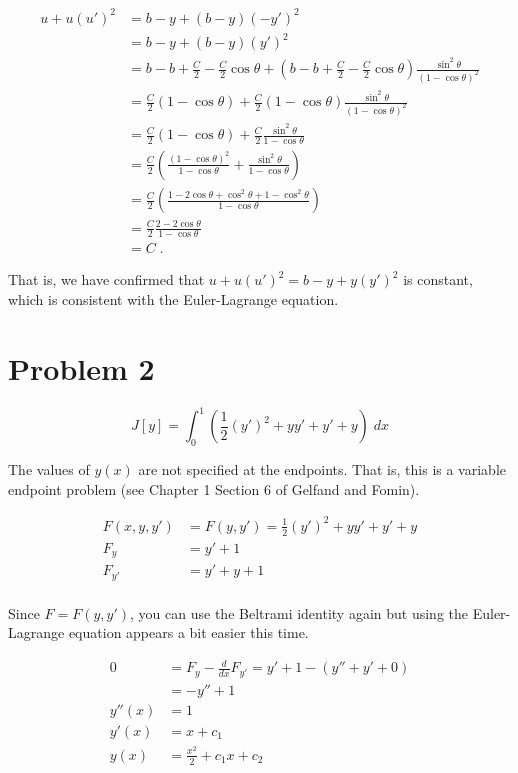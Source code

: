 \documentclass[a4paper]{article}
\begin{document}
\begin{align*}
u + u(u')^2 &= b-y + (b-y)(-y')^2 \\
&= b-y + (b-y)(y')^2 \\
&= b - b + \frac{C}{2} - \frac{C}{2}\cos \theta + (b - b + \frac{C}{2} - \frac{C}{2}\cos \theta)\frac{\sin^2\theta}{(1-\cos \theta)^2} \\
&= \frac{C}{2}(1-\cos \theta)+ \frac{C}{2}(1 - \cos \theta)\frac{\sin^2\theta}{(1-\cos \theta)^2} \\
&= \frac{C}{2}(1-\cos \theta) + \frac{C}{2}\frac{\sin^2\theta}{1-\cos \theta} \\
&= \frac{C}{2} \left(\frac{(1-\cos \theta)^2}{1-\cos \theta} + \frac{\sin^2\theta}{1-\cos \theta} \right) \\
&= \frac{C}{2} \left(\frac{1-2\cos \theta + \cos^2 \theta + 1- \cos^2 \theta}{1-\cos \theta} \right) \\
&= \frac{C}{2}\frac{2-2\cos \theta}{1-\cos \theta}  \\
& = C \;.
\end{align*}

That is, we have confirmed that $u + u(u')^2 = b-y + y(y')^2$ is constant, which is consistent with the Euler-Lagrange equation.


\section*{Problem 2}

$$J[y] = \int_0^1 \left( \frac{1}{2}(y')^2 + yy' + y' + y\right) \; dx $$

The values of $y(x)$ are not specified at the endpoints. That is, this is a variable endpoint problem (see Chapter 1 Section 6 of Gelfand and Fomin).

\begin{align*}
F(x,y,y') &= F(y,y') = \frac{1}{2}(y')^2 + yy' + y' + y \\
F_y &=y' + 1 \\
F_{y'} &= y' + y + 1\\
\end{align*}

Since $F = F(y,y')$, you can use the Beltrami identity again but using the Euler-Lagrange equation appears a bit easier this time.

\begin{align*}
0 &= F_y - \frac{d}{dx}F_{y'} = y' + 1 - (y'' + y' +0) \\
&= -y'' + 1 \\
y''(x) &= 1 \\
y'(x) &= x + c_1 \\
y(x) &= \frac{x^2}{2} + c_1x + c_2 \\
\end{align*}
\end{document}
